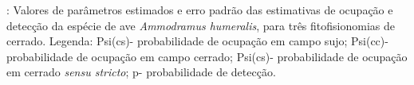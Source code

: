 \label{fig:aves5}: Valores de parâmetros estimados e erro padrão das estimativas de ocupação e detecção da espécie de ave \textit{Ammodramus humeralis}, para três fitofisionomias de cerrado. Legenda: Psi(cs)- probabilidade de ocupação em campo sujo; Psi(cc)- probabilidade de ocupação em campo cerrado; Psi(cs)- probabilidade de ocupação em cerrado \textit{sensu stricto}; p- probabilidade de detecção.
 